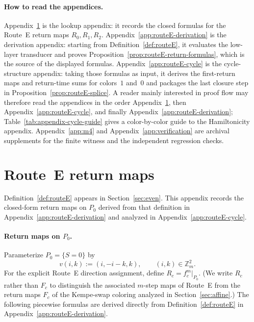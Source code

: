 \documentclass[11pt]{article}
\begin{document}
\appendix

\paragraph{How to read the appendices.}
Appendix~\ref{app:routeE} is the lookup appendix: it records the closed formulas for the Route~E return maps $R_0,R_1,R_2$.
Appendix~\ref{app:routeE-derivation} is the derivation appendix: starting from Definition~\ref{def:routeE}, it evaluates the low-layer transducer and proves Proposition~\ref{prop:routeE-return-formulas}, which is the source of the displayed formulas.
Appendix~\ref{app:routeE-cycle} is the cycle-structure appendix: taking those formulas as input, it derives the first-return maps and return-time sums for colors~$1$ and~$0$ and packages the last closure step in Proposition~\ref{prop:routeE-splice}.
A reader mainly interested in proof flow may therefore read the appendices in the order Appendix~\ref{app:routeE}, then Appendix~\ref{app:routeE-cycle}, and finally Appendix~\ref{app:routeE-derivation}; Table~\ref{tab:appendix-cycle-guide} gives a color-by-color guide to the Hamiltonicity appendix.
Appendix~\ref{app:m4} and Appendix~\ref{app:verification} are archival supplements for the finite witness and the independent regression checks.
\section{Route~E return maps}\label{app:routeE}

Definition~\ref{def:routeE} appears in Section~\ref{sec:even}.
This appendix records the closed-form return maps on $P_0$ derived from that definition in Appendix~\ref{app:routeE-derivation} and analyzed in Appendix~\ref{app:routeE-cycle}.

\paragraph{Return maps on $P_0$.}
Parameterize $P_0=\{S=0\}$ by
\[
v(i,k):=(i,-i-k,k),\qquad (i,k)\in\mathbb Z_m^2.
\]
For the explicit Route~E direction assignment, define $R_c=f_c^m|_{P_0}$.
(We write $R_c$ rather than $F_c$ to distinguish the associated $m$-step maps of Route~E from the return maps $F_c$ of the Kempe-swap coloring analyzed in Section~\ref{sec:affine}.)
The following piecewise formulas are derived directly from Definition~\ref{def:routeE} in Appendix~\ref{app:routeE-derivation}.
\end{document}
